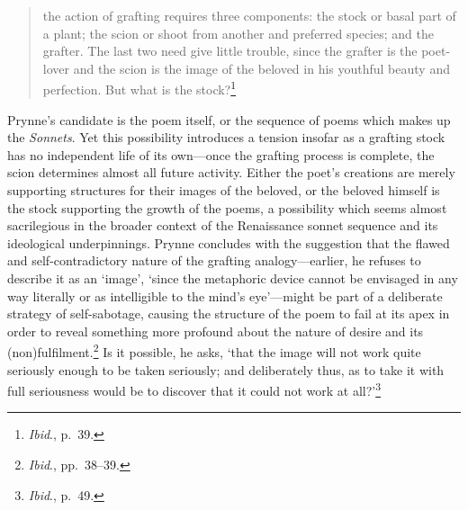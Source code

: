 \documentclass[]{article}
\begin{document}
\begin{quote}
\singlespacing the action of grafting requires three components: the
stock or basal part of a plant; the scion or shoot from another and
preferred species; and the grafter. The last two need give little
trouble, since the grafter is the poet-lover and the scion is the image
of the beloved in his youthful beauty and perfection. But what is the
stock?\footnote{\emph{Ibid}., p.~39.}
\end{quote}

\noindent Prynne’s candidate is the poem itself, or the sequence of
poems which makes up the \emph{Sonnets}. Yet this possibility introduces
a tension insofar as a grafting stock has no independent life of its
own—once the grafting process is complete, the scion determines almost
all future activity. Either the poet’s creations are merely supporting
structures for their images of the beloved, or the beloved himself is
the stock supporting the growth of the poems, a possibility which seems
almost sacrilegious in the broader context of the Renaissance sonnet
sequence and its ideological underpinnings. Prynne concludes with the
suggestion that the flawed and self-contradictory nature of the grafting
analogy—earlier, he refuses to describe it as an ‘image’, ‘since the
metaphoric device cannot be envisaged in any way literally or as
intelligible to the mind’s eye’—might be part of a deliberate strategy
of self-sabotage, causing the structure of the poem to fail at its apex
in order to reveal something more profound about the nature of desire
and its (non)fulfilment.\footnote{\emph{Ibid}., pp.~38–39.} Is it
possible, he asks, ‘that the image will not work quite seriously enough
to be taken seriously; and deliberately thus, as to take it with full
seriousness would be to discover that it could not work at
all?’\footnote{\emph{Ibid}., p.~49.}
\end{document}
